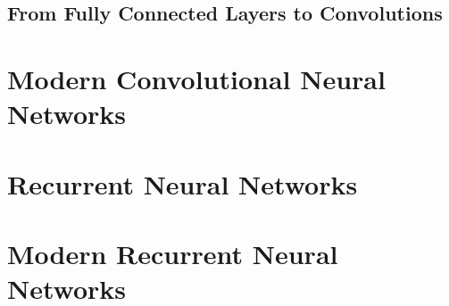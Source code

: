 \documentclass[a4paper,12pt]{article}
\theoremstyle{definition}
\begin{document}
    \subsection*{From Fully Connected Layers to Convolutions}

    \section{Modern Convolutional Neural Networks}

    \section{Recurrent Neural Networks}

    \section{Modern Recurrent Neural Networks}
\end{document}
